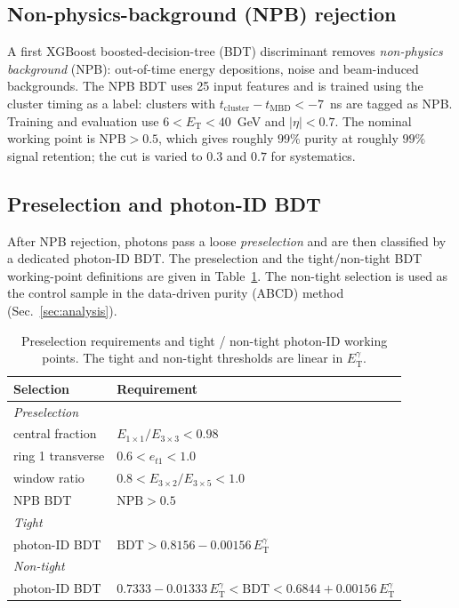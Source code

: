 \documentclass[11pt]{article}
\newcommand{\ET}{E_{\mathrm{T}}}
\newcommand{\ETg}{E_{\mathrm{T}}^{\gamma}}
\begin{document}
\subsection{Non-physics-background (NPB) rejection}

A first XGBoost boosted-decision-tree (BDT) discriminant removes
\emph{non-physics background} (NPB): out-of-time energy depositions, noise and
beam-induced backgrounds. The NPB BDT uses 25 input features and is trained
using the cluster timing as a label: clusters with
$t_{\mathrm{cluster}} - t_{\mathrm{MBD}} < -7$~ns are tagged as NPB. Training and
evaluation use $6 < \ET < 40$~GeV and $|\eta| < 0.7$. The nominal working point
is $\mathrm{NPB} > 0.5$, which gives roughly $99\%$ purity at roughly $99\%$
signal retention; the cut is varied to $0.3$ and $0.7$ for systematics.

\subsection{Preselection and photon-ID BDT}

After NPB rejection, photons pass a loose \emph{preselection} and are then
classified by a dedicated photon-ID BDT. The preselection and the
tight/non-tight BDT working-point definitions are given in
Table~\ref{tab:presel}. The non-tight selection is used as the control sample in
the data-driven purity (ABCD) method (Sec.~\ref{sec:analysis}).

\begin{table}[h]
\centering
\caption{Preselection requirements and tight / non-tight photon-ID working
points. The tight and non-tight thresholds are linear in $\ETg$.}
\label{tab:presel}
\begin{tabular}{ll}
\toprule
Selection & Requirement \\
\midrule
\multicolumn{2}{l}{\textit{Preselection}}\\
\quad central fraction & $E_{1\times1}/E_{3\times3} < 0.98$ \\
\quad ring 1 transverse & $0.6 < e_{t1} < 1.0$ \\
\quad window ratio & $0.8 < E_{3\times2}/E_{3\times5} < 1.0$ \\
\quad NPB BDT & $\mathrm{NPB} > 0.5$ \\
\midrule
\multicolumn{2}{l}{\textit{Tight}}\\
\quad photon-ID BDT & $\mathrm{BDT} > 0.8156 - 0.00156\,\ETg$ \\
\midrule
\multicolumn{2}{l}{\textit{Non-tight}}\\
\quad photon-ID BDT & $0.7333 - 0.01333\,\ETg < \mathrm{BDT} < 0.6844 + 0.00156\,\ETg$ \\
\bottomrule
\end{tabular}
\end{table}
\end{document}
